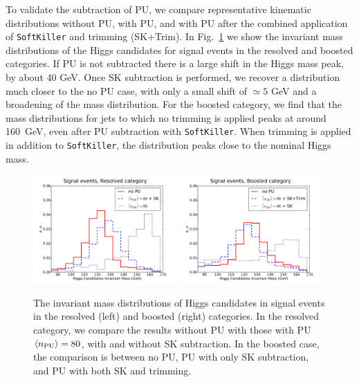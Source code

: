 To validate the subtraction of PU,
we compare representative kinematic distributions
without PU, with PU, and with PU after the combined
application of {\tt SoftKiller} and trimming (SK+Trim).
%
In Fig.~\ref{fig:PUvalidation} we show the
invariant mass distributions of the
Higgs candidates for signal
events in the resolved and boosted categories.
%
If PU is not subtracted there is a large shift in the Higgs mass
peak, by about 40 GeV.
%
Once SK subtraction is performed, we recover a distribution much closer
to the no PU case, with only a small shift of $\simeq 5$ GeV
and a broadening of the mass
distribution.
%
For the boosted category, we find that
the mass distributions for jets to which no trimming
is applied peaks at around 160~GeV, even
after PU subtraction with {\tt SoftKiller}.
%
When trimming is applied in addition to {\tt SoftKiller}, 
the distribution peaks close to the nominal Higgs mass.

\begin{figure}[t]
  \begin{center}
    \includegraphics[width=0.49\textwidth]{plots/m_htot_res_signal_PUnoSK.pdf}
    \includegraphics[width=0.49\textwidth]{plots/m_htot_bst_signal_PUnoTrim.pdf}
    \caption{\small
    The invariant mass distributions of Higgs candidates in signal
    events in the resolved (left) and boosted
    (right) categories.
    In the resolved category,
    we compare  the results without PU
    with those with PU $\left\langle n_{\rm PU}\right\rangle=80$,
    with and without SK subtraction.
    In the boosted case, the comparison is between no PU,
    PU with only SK subtraction,
    and PU with both SK and trimming.
}
\label{fig:PUvalidation}
\end{center}
\end{figure}

